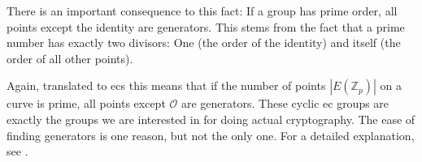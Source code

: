 There is an important consequence to this fact: If a group has prime order, all points except the identity are generators.
This stems from the fact that a prime number has exactly two divisors: One (the order of the identity) and itself (the order of all other points).

Again, translated to \glspl{ec} this means that if the number of points $|E(\mathbb{Z}_p)|$ on a curve is prime, all points except $\mathcal{O}$ are generators.
These cyclic \gls{ec} groups are exactly the groups we are interested in for doing actual cryptography.
The ease of finding generators is one reason, but not the only one. 
For a detailed explanation, see \cite[p.~321]{katz_introduction_2015}.








